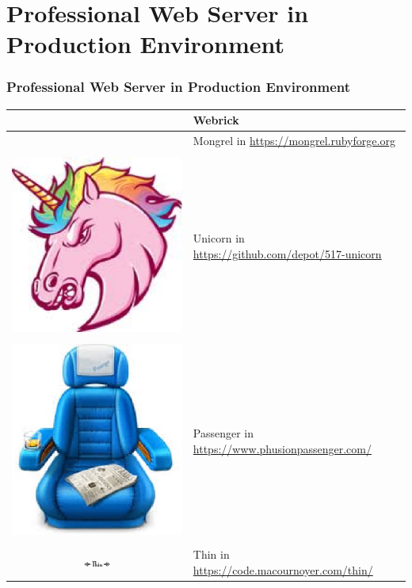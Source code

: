 \documentclass{beamer}
\begin{document}
\section{Professional Web Server in Production Environment}
\begin{frame}[fragile]
\frametitle{Professional Web Server in Production Environment}

\begin{tabular}{|c|l|} \hline
 & Webrick \\ \hline
 & Mongrel in \href{https://mongrel.rubyforge.org}{https://mongrel.rubyforge.org}\\ \hline & \\
\includegraphics[width=0.15 \textwidth]{unicorn.eps} & Unicorn in \href{https://github.com/depot/517-unicorn}{https://github.com/depot/517-unicorn} \\ \hline & \\
\includegraphics[width=0.15 \textwidth]{passenger.eps} & Passenger in \href{https://www.phusionpassenger.com/}{https://www.phusionpassenger.com/} \\ \hline & \\
\includegraphics[width=0.15\textwidth]{thin.eps}  & Thin in \href{https://code.macournoyer.com/thin/}{https://code.macournoyer.com/thin/} \\ \hline
\end{tabular}


\end{frame}
\end{document}
